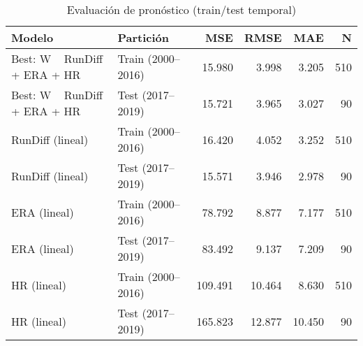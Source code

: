 \begin{table}
\caption{Evaluación de pronóstico (train/test temporal)}
\label{tab:forecast_eval}
\begin{tabular}{llrrrr}
\toprule
Modelo & Partición & MSE & RMSE & MAE & N \\
\midrule
Best: W ~ RunDiff + ERA + HR & Train (2000–2016) & 15.980 & 3.998 & 3.205 & 510 \\
Best: W ~ RunDiff + ERA + HR & Test (2017–2019) & 15.721 & 3.965 & 3.027 & 90 \\
RunDiff (lineal) & Train (2000–2016) & 16.420 & 4.052 & 3.252 & 510 \\
RunDiff (lineal) & Test (2017–2019) & 15.571 & 3.946 & 2.978 & 90 \\
ERA (lineal) & Train (2000–2016) & 78.792 & 8.877 & 7.177 & 510 \\
ERA (lineal) & Test (2017–2019) & 83.492 & 9.137 & 7.209 & 90 \\
HR (lineal) & Train (2000–2016) & 109.491 & 10.464 & 8.630 & 510 \\
HR (lineal) & Test (2017–2019) & 165.823 & 12.877 & 10.450 & 90 \\
\bottomrule
\end{tabular}
\end{table}
